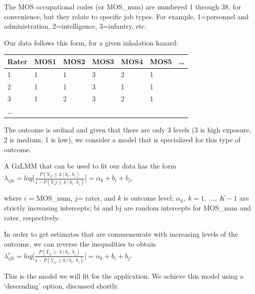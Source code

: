 \documentclass[
  9pt,
  ignorenonframetext,
]{beamer}
\begin{document}
\begin{frame}{}
\protect\hypertarget{section}{}
The MOS occupational codes (or MOS\_num) are numbered 1 through 38, for
convenience, but they relate to specific job types. For example,
1=personnel and administration, 2=intelligence, 3=infantry, etc.

Our data follows this form, for a given inhalation hazard:

\begin{longtable}[]{@{}lllllll@{}}
\toprule
Rater & MOS1 & MOS2 & MOS3 & MOS4 & MOS5 & \ldots{}\tabularnewline
\midrule
\endhead
1 & 1 & 1 & 3 & 2 & 1 &\tabularnewline
2 & 1 & 1 & 3 & 1 & 1 &\tabularnewline
3 & 1 & 2 & 3 & 2 & 1 &\tabularnewline
\ldots{} & & & & & &\tabularnewline
\bottomrule
\end{longtable}

The outcome is ordinal and given that there are only 3 levels (3 is high
exposure, 2 is medium, 1 is low), we consider a model that is
specialized for this type of outcome.
\end{frame}

\begin{frame}{}
\protect\hypertarget{section-1}{}
A GzLMM that can be used to fit our data has the form
\(\lambda_{ijk} = log\Big[\frac {P(Y_{ij} \leq k\ |\ b_i,\ b_j)} {1-P(Y{_ij} \leq k\ |\ b_i,\ b_j)}\Big] = \alpha_k + b_i + b_j\),

where \(i\) = MOS\_num, \(j\)= rater, and \(k\) is outcome level;
\(\alpha_k,\ k=1,\ ...,\ K-1\) are strictly increasing intercepts; bi
and bj are random intercepts for MOS\_num and rater, respectively.

In order to get estimates that are commensurate with increasing levels
of the outcome, we can reverse the inequalities to obtain
\(\lambda_{ijk}^c = log \Big[ \frac {P(Y_{ij} \geq\ k\ |\ b_i,\ b_j)} {1 - P(Y_{ij} \geq k\ |\ b_i,\ b_j)}\Big]=\alpha _k+b_i+b_j\).

This is the model we will fit for the application. We achieve this model
using a `descending' option, discussed shortly.
\end{frame}
\end{document}
